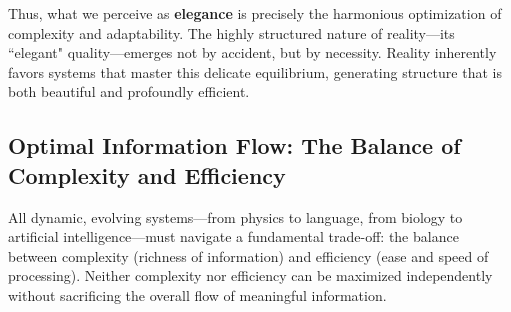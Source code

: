 \documentclass[12pt]{article}
\begin{document}
Thus, what we perceive as \textbf{elegance} is precisely the harmonious optimization of complexity and adaptability. The highly structured nature of reality—its ``elegant" quality—emerges not by accident, but by necessity. Reality inherently favors systems that master this delicate equilibrium, generating structure that is both beautiful and profoundly efficient.

\subsection{Optimal Information Flow: The Balance of Complexity and Efficiency}

All dynamic, evolving systems—from physics to language, from biology to artificial intelligence—must navigate a fundamental trade-off: the balance between complexity (richness of information) and efficiency (ease and speed of processing). Neither complexity nor efficiency can be maximized independently without sacrificing the overall flow of meaningful information.
\end{document}

